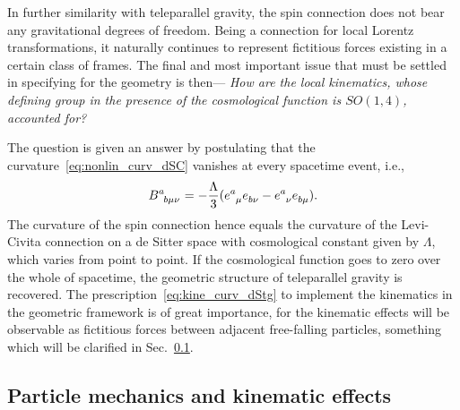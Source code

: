 \documentclass[%
aps,
prd,
reprint
]{revtex4-1}
\newcommand{\ind}{\indices}
\begin{document}
In further similarity with teleparallel gravity, the spin 
connection does not bear any gravitational degrees of freedom.  
Being a connection for local Lorentz transformations, it 
naturally continues to represent fictitious forces existing in 
a certain class of frames. The final and most important issue 
that must be settled in specifying for the geometry is then--- 
\emph{How are the local kinematics, whose defining group in the 
  presence of the cosmological function is $SO(1,4)$, accounted 
  for?}

The question is given an answer by postulating that the 
curvature~\eqref{eq:nonlin_curv_dSC} vanishes at every spacetime 
event, i.e.,
\begin{equation}
\label{eq:kine_curv_dStg}
  B\ind{^a_{b\mu\nu}} = -\frac{\Lambda}{3} (e\ind{^a_\mu} 
  e\ind{_{b\nu}} - e\ind{^a_\nu} e\ind{_{b\mu}}).
\end{equation}
The curvature of the spin connection hence equals the curvature 
of the Levi-Civita connection on a de Sitter space with 
cosmological constant given by $\Lambda$, which varies from point 
to point. If the cosmological function goes to zero over the 
whole of spacetime, the geometric structure of teleparallel 
gravity is recovered. The prescription~\eqref{eq:kine_curv_dStg} 
to implement the kinematics in the geometric framework is of 
great importance, for the kinematic effects will be observable as 
fictitious forces between adjacent free-falling particles, 
something which will be clarified in Sec.~\ref{ssec:part_mech}.


\subsection{Particle mechanics and kinematic effects}
\label{ssec:part_mech}
\end{document}

